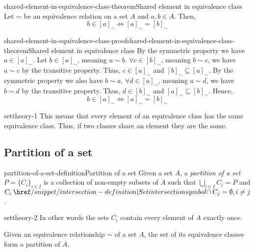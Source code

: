 \documentclass[preview]{standalone}
\begin{document}
\begin{snippettheorem}{shared-element-in-equivalence-class-theorem}{Shared element in equivalence class}
    Let \(\sim\) be an equivalence relation on a set \(A\)
    and \(a,b \in A\).
    Then,
    \[
        b \in {[a]}_{\sim} \iff {[a]}_{\sim} = {[b]}_{\sim}
    \]
\end{snippettheorem}

\begin{snippetproof}{shared-element-in-equivalence-class-proof}{shared-element-in-equivalence-class-theorem}{Shared element in equivalence class}
    By the symmetric property we have \(a \in {[a]}_{\sim}\).
    Let \(b \in {[a]}_{\sim}\), meaning \(a \sim b\). \(\forall c \in {[b]}_{\sim}\),
    meaning \(b \sim c\), we have \(a \sim c\) by the transitive property.
    Thus, \(c \in {[a]}_{\sim}\) and \({[b]}_{\sim} \subseteq {[a]}_{\sim}\).
    By the symmetric property we also have \(b \sim a\),
    \(\forall d \in {[a]}_{\sim}\), meaning \(a \sim d\), we have
    \(b \sim d\) by the transitive property. Thus, \(d \in {[b]}_{\sim}\)
    and \({[a]}_{\sim} \subseteq {[b]}_{\sim}\). Hence,
    \[
        b \in {[a]}_{\sim} \iff {[a]}_{\sim} = {[b]}_{\sim}
    \]
\end{snippetproof}

\begin{snippet}{settheory-1}
This means that every element of an equivalence class has the same equivalence class.
Thus, if two classes share an element they are the same.
\end{snippet}

\subsection{Partition of a set}

\begin{snippetdefinition}{partition-of-a-set-definition}{Partition of a set}
    Given a set \(A\), a \textit{partition of a set} \(P={\{C_i\}}_{i\in I}\) is a collection of
    non-empty subsets of \(A\) such that \(\bigcup_{i\in I} C_i = P\) and
    \(C_i \intersection C_j = \emptyset, i \neq j\).
\end{snippetdefinition}

\begin{snippet}{settheory-2}
In other words the sets \(C_i\)
contain every element of \(A\) exactly once.

Given an equivalence relationship \(\sim\) of a set \(A\),
the set of its equivalence classes form a partition of \(A\).
\end{snippet}
\end{document}
